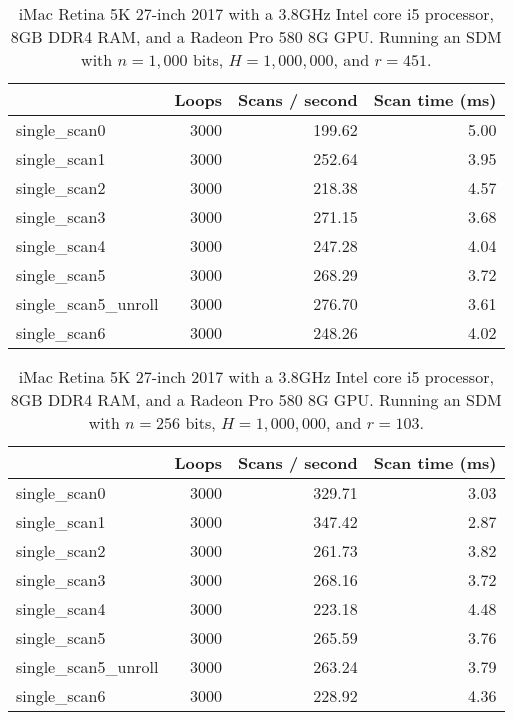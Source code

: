 \begin{table}[!htb]
\centering
\begin{tabular}{| l | r | r | r |}
    \hline
    & Loops & Scans / second & Scan time (ms) \\ \hline
    single\_scan0 & 3000 & 199.62 & 5.00 \\
    single\_scan1 & 3000 & 252.64 & 3.95 \\
    single\_scan2 & 3000 & 218.38 & 4.57 \\
    single\_scan3 & 3000 & 271.15 & 3.68 \\
    single\_scan4 & 3000 & 247.28 & 4.04 \\
    single\_scan5 & 3000 & 268.29 & 3.72 \\
    single\_scan5\_unroll & 3000 & 276.70 & 3.61 \\
    single\_scan6 & 3000 & 248.26 & 4.02 \\
    \hline
\end{tabular}
\caption{iMac Retina 5K 27-inch 2017 with a 3.8GHz Intel core i5 processor, 8GB DDR4 RAM, and a Radeon Pro 580 8G GPU. Running an SDM with $n=1,000$ bits, $H=1,000,000$, and $r=451$.
\label{tab:perf-imac-kernels-1000}}
\end{table}

\begin{table}[!htb]
\centering
\begin{tabular}{| l | r | r | r |}
    \hline
    & Loops & Scans / second & Scan time (ms) \\ \hline
    single\_scan0 & 3000 & 329.71 & 3.03 \\
    single\_scan1 & 3000 & 347.42 & 2.87 \\
    single\_scan2 & 3000 & 261.73 & 3.82 \\
    single\_scan3 & 3000 & 268.16 & 3.72 \\
    single\_scan4 & 3000 & 223.18 & 4.48 \\
    single\_scan5 & 3000 & 265.59 & 3.76 \\
    single\_scan5\_unroll & 3000 & 263.24 & 3.79 \\
    single\_scan6 & 3000 & 228.92 & 4.36 \\
    \hline
\end{tabular}
\caption{iMac Retina 5K 27-inch 2017 with a 3.8GHz Intel core i5 processor, 8GB DDR4 RAM, and a Radeon Pro 580 8G GPU. Running an SDM with $n=256$ bits, $H=1,000,000$, and $r=103$.
\label{tab:perf-imac-kernels-256}}
\end{table}


